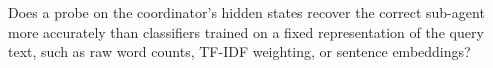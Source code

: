 \begin{rqbox}[RQ2]
Does a probe on the coordinator's hidden states recover the correct sub-agent more accurately than classifiers trained on a fixed representation of the query text, such as raw word counts, TF-IDF weighting, or sentence embeddings?
\end{rqbox}
